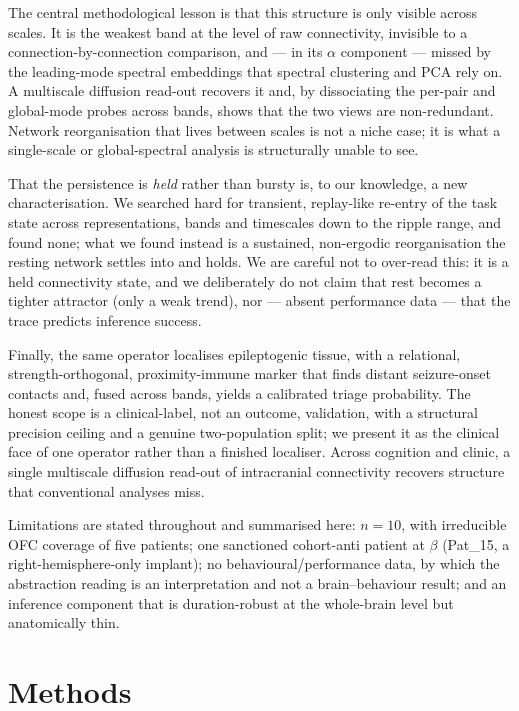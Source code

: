 \documentclass[11pt]{article}
\begin{document}
The central methodological lesson is that this structure is only visible across
scales. It is the weakest band at the level of raw connectivity, invisible to a
connection-by-connection comparison, and --- in its $\alpha$ component --- missed
by the leading-mode spectral embeddings that spectral clustering and PCA rely on.
A multiscale diffusion read-out recovers it and, by dissociating the per-pair and
global-mode probes across bands, shows that the two views are non-redundant.
Network reorganisation that lives between scales is not a niche case; it is what a
single-scale or global-spectral analysis is structurally unable to see.

That the persistence is \emph{held} rather than bursty is, to our knowledge, a
new characterisation. We searched hard for transient, replay-like re-entry of the
task state across representations, bands and timescales down to the ripple range,
and found none; what we found instead is a sustained, non-ergodic reorganisation
the resting network settles into and holds. We are careful not to over-read this:
it is a held connectivity state, and we deliberately do not claim that rest
becomes a tighter attractor (only a weak trend), nor --- absent performance data
--- that the trace predicts inference success.

Finally, the same operator localises epileptogenic tissue, with a relational,
strength-orthogonal, proximity-immune marker that finds distant seizure-onset
contacts and, fused across bands, yields a calibrated triage probability. The
honest scope is a clinical-label, not an outcome, validation, with a structural
precision ceiling and a genuine two-population split; we present it as the
clinical face of one operator rather than a finished localiser. Across cognition
and clinic, a single multiscale diffusion read-out of intracranial connectivity
recovers structure that conventional analyses miss.

Limitations are stated throughout and summarised here: $n=10$, with irreducible
OFC coverage of five patients; one sanctioned cohort-anti patient at $\beta$
(Pat\_15, a right-hemisphere-only implant); no behavioural/performance data, by
which the abstraction reading is an interpretation and not a brain--behaviour
result; and an inference component that is duration-robust at the whole-brain
level but anatomically thin.

\section{Methods}
\end{document}
